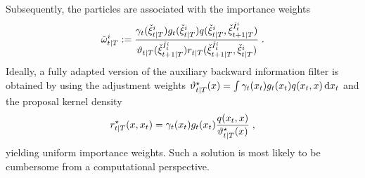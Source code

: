 Subsequently, the particles are associated with the importance weights
\begin{equation}
\label{eq:ebackweight-update-backward-filtering}
\ebackwght{t}{T}{i} \eqdef \frac{\gamma_t(\ebackpart{t}{T}{i}) g_t(\ebackpart{t}{T}{i}) q(\ebackpart{t}{T}{i},\ebackpart{t+1}{T}{\check{I}^i_t})}{\adjfunc{t}{T}{\ebackpart{t+1}{T}{\check{I}^i_t}} \kiss{t}{T}(\ebackpart{t+1}{T}{\check{I}^i_t}, \ebackpart{t}{T}{i})} \eqsp.
\end{equation}
Ideally, a fully adapted version of the auxiliary backward information filter is obtained by using the adjustment weights $\adjfunc[fully]{t}{T}{x}=  \int \gamma_t(x_t) g_t(x_t) q(x_t,x) \, \rmd x_t $ and the proposal kernel density
\[
\kiss[fully]{t}{T}(x, x_t)=\gamma_t(x_t) g_t(x_t) \frac{q(x_t,x)}{\adjfunc[fully]{t}{T}{x}} \eqsp,
\]
yielding uniform importance weights. Such a solution is most likely to be cumbersome from a computational perspective.

